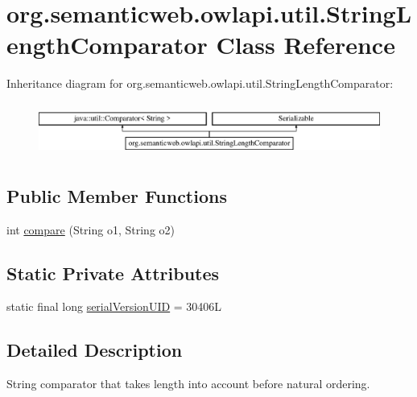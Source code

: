\hypertarget{classorg_1_1semanticweb_1_1owlapi_1_1util_1_1_string_length_comparator}{\section{org.\-semanticweb.\-owlapi.\-util.\-String\-Length\-Comparator Class Reference}
\label{classorg_1_1semanticweb_1_1owlapi_1_1util_1_1_string_length_comparator}
}
Inheritance diagram for org.\-semanticweb.\-owlapi.\-util.\-String\-Length\-Comparator\-:\begin{figure}[H]
\begin{center}
\leavevmode
\includegraphics[height=1.772152cm]{classorg_1_1semanticweb_1_1owlapi_1_1util_1_1_string_length_comparator}
\end{center}
\end{figure}
\subsection*{Public Member Functions}
\begin{DoxyCompactItemize}
\item 
int \hyperlink{classorg_1_1semanticweb_1_1owlapi_1_1util_1_1_string_length_comparator_a2206a47e0ed84fc27a23324160eaaec1}{compare} (String o1, String o2)
\end{DoxyCompactItemize}
\subsection*{Static Private Attributes}
\begin{DoxyCompactItemize}
\item 
static final long \hyperlink{classorg_1_1semanticweb_1_1owlapi_1_1util_1_1_string_length_comparator_a659b46a80d0e5b4254f15f939595dbef}{serial\-Version\-U\-I\-D} = 30406\-L
\end{DoxyCompactItemize}


\subsection{Detailed Description}
String comparator that takes length into account before natural ordering. 

